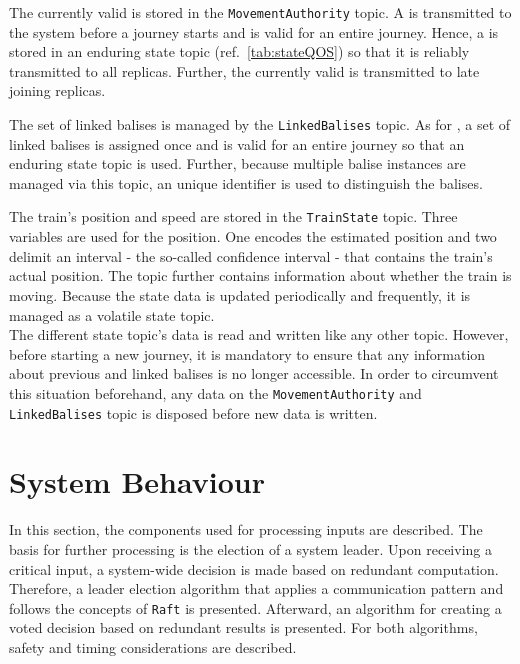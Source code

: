 \noindent
The currently valid  is stored in the \texttt{MovementAuthority} topic.
A  is transmitted to the system before a journey starts and is valid for an entire journey.
Hence, a  is stored in an enduring state topic (ref.~\autoref{tab:stateQOS}) so that it is reliably transmitted to all replicas.
Further, the currently valid  is transmitted to late joining replicas.

The set of linked balises is managed by the \texttt{LinkedBalises} topic.
As for , a set of linked balises is assigned once and is valid for an entire journey so that an enduring state topic is used.
Further, because multiple balise instances are managed via this topic, an unique identifier is used to distinguish the balises.

The train's position and speed are stored in the \texttt{TrainState} topic.
Three variables are used for the position.
One encodes the estimated position and two delimit an interval - the so-called confidence interval - that contains the train's actual position.
The topic further contains information about whether the train is moving.
Because the state data is updated periodically and frequently, it is managed as a volatile  state topic.
\\

\noindent
The different state topic's data is read and written like any other  topic.
However, before starting a new journey, it is mandatory to ensure that any information about previous  and linked balises is no longer accessible.
In order to circumvent this situation beforehand, any data on the \texttt{MovementAuthority} and \texttt{LinkedBalises} topic is disposed before new data is written.

\section{System Behaviour}

In this section, the components used for processing inputs are described.
The basis for further processing is the election of a system leader.
Upon receiving a critical input, a system-wide decision is made based on redundant computation.
Therefore, a leader election algorithm that applies a  communication pattern and follows the concepts of \texttt{Raft} is presented.
Afterward, an algorithm for creating a voted decision based on redundant results is presented.
For both algorithms, safety and timing considerations are described.
\\

